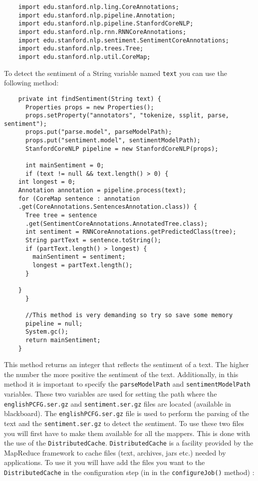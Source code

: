 \documentclass[a4paper,10pt]{article}
\begin{document}
  \begin{lstlisting}
    import edu.stanford.nlp.ling.CoreAnnotations;
    import edu.stanford.nlp.pipeline.Annotation;
    import edu.stanford.nlp.pipeline.StanfordCoreNLP;
    import edu.stanford.nlp.rnn.RNNCoreAnnotations;
    import edu.stanford.nlp.sentiment.SentimentCoreAnnotations;
    import edu.stanford.nlp.trees.Tree;
    import edu.stanford.nlp.util.CoreMap;
  \end{lstlisting}
  
  To detect the sentiment of a String variable named \texttt{text} you can use the following method:
  \begin{lstlisting}
    private int findSentiment(String text) {
      Properties props = new Properties();
      props.setProperty("annotators", "tokenize, ssplit, parse, sentiment");
      props.put("parse.model", parseModelPath);
      props.put("sentiment.model", sentimentModelPath);
      StanfordCoreNLP pipeline = new StanfordCoreNLP(props);
      
      int mainSentiment = 0;
      if (text != null && text.length() > 0) {
	int longest = 0;
	Annotation annotation = pipeline.process(text);
	for (CoreMap sentence : annotation
	.get(CoreAnnotations.SentencesAnnotation.class)) {
	  Tree tree = sentence
	  .get(SentimentCoreAnnotations.AnnotatedTree.class);
	  int sentiment = RNNCoreAnnotations.getPredictedClass(tree);
	  String partText = sentence.toString();
	  if (partText.length() > longest) {
	    mainSentiment = sentiment;
	    longest = partText.length();
	  }
	  
	}
      }
      
      //This method is very demanding so try so save some memory 
      pipeline = null;
      System.gc();
      return mainSentiment;
    }
  \end{lstlisting}
  
  This method returns an integer that reflects the sentiment of a text. The higher the number the more positive the sentiment of the text. Additionally,  in this method it is important to specify the \texttt{parseModelPath} and \texttt{sentimentModelPath} variables. These two variables are used for setting the path where the \texttt{englishPCFG.ser.gz} and \texttt{sentiment.ser.gz} files are located (available in blackboard). The \texttt{englishPCFG.ser.gz} file is used to perform the parsing of the text and the \texttt{sentiment.ser.gz} to detect the sentiment. To use these two files you will first have to make them available for all the mappers. This is done with the use of the \texttt{DistributedCache}. \texttt{DistributedCache} is a facility provided by the MapReduce framework to cache files (text, archives, jars etc.) needed by applications. To use it you will have add the files you want to the \texttt{DistributedCache} in the configuration step (in in the \texttt{configureJob()} method) :
  
\end{document}

